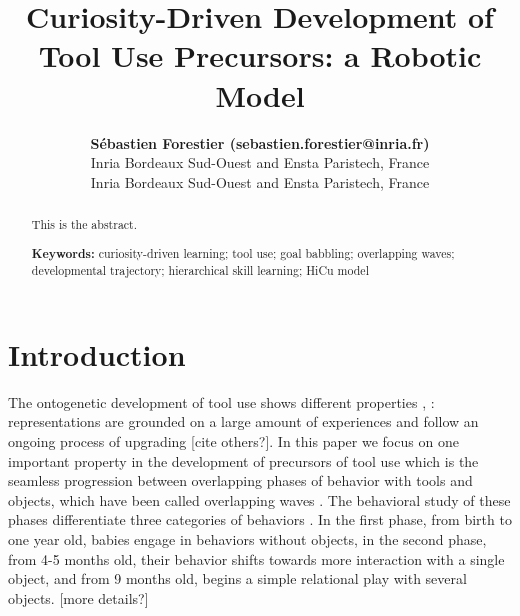 \documentclass[10pt,letterpaper]{article}
\title{Curiosity-Driven Development of Tool Use Precursors: a Robotic Model}
\author{{\large \bf S\'ebastien Forestier (sebastien.forestier@inria.fr)} \\
	Inria Bordeaux Sud-Ouest and Ensta Paristech, France
  \AND {\large \bf Pierre-Yves Oudeyer (pierre-yves.oudeyer@inria.fr)} \\
	Inria Bordeaux Sud-Ouest and Ensta Paristech, France}
\begin{document}
\maketitle


\begin{abstract}
This is the abstract.

\textbf{Keywords:} 
curiosity-driven learning; tool use; goal babbling; overlapping waves; developmental trajectory; hierarchical skill learning; HiCu model
\end{abstract}


\section{Introduction}

	The ontogenetic development of tool use shows different properties \cite{guerin2013survey}, \cite{fenson1976developmental}: 
	representations are grounded on a large amount of experiences and follow an ongoing process of upgrading [cite others?].
	In this paper we focus on one important property in the development of precursors of tool use which is the seamless progression 
	between overlapping phases of behavior with tools and objects, which have been called overlapping waves \cite{siegler1996emerging}. 
	The behavioral study of these phases differentiate three categories of behaviors \cite{guerin2013survey}.
	In the first phase, from birth to one year old, babies engage in behaviors without objects, in the second phase, from 4-5 months old, their behavior shifts towards more interaction with a single object, and from 9 months old, begins a simple relational play with several objects.
	[more details?]
	
\end{document}
